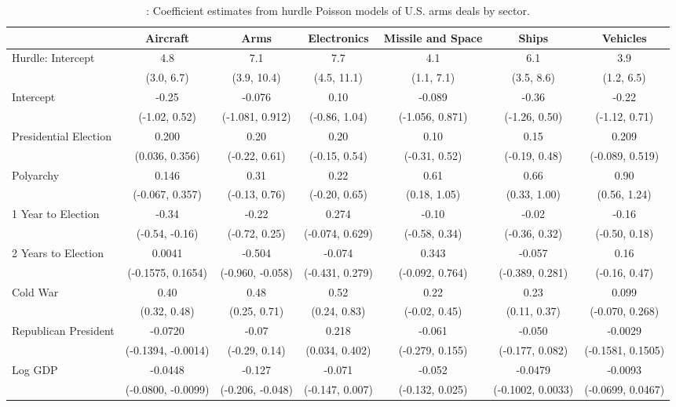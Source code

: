 \begin{table}[H]

\caption{\label{tab:pois-regs-sector}: Coefficient estimates from hurdle Poisson models of U.S. arms deals by sector.}
\centering
\fontsize{8}{10}\selectfont
\begin{tabular}[t]{lcccccc}
\toprule
  & Aircraft & Arms & Electronics & Missile and Space & Ships & Vehicles\\
\midrule
Hurdle: Intercept & 4.8 & 7.1 & 7.7 & 4.1 & 6.1 & 3.9\\
 & (3.0, 6.7) & (3.9, 10.4) & (4.5, 11.1) & (1.1, 7.1) & (3.5, 8.6) & (1.2, 6.5)\\
Intercept & -0.25 & -0.076 & 0.10 & -0.089 & -0.36 & -0.22\\
 & (-1.02, 0.52) & (-1.081, 0.912) & (-0.86, 1.04) & (-1.056, 0.871) & (-1.26, 0.50) & (-1.12, 0.71)\\
Presidential Election & 0.200 & 0.20 & 0.20 & 0.10 & 0.15 & 0.209\\
 & (0.036, 0.356) & (-0.22, 0.61) & (-0.15, 0.54) & (-0.31, 0.52) & (-0.19, 0.48) & (-0.089, 0.519)\\
Polyarchy & 0.146 & 0.31 & 0.22 & 0.61 & 0.66 & 0.90\\
 & (-0.067, 0.357) & (-0.13, 0.76) & (-0.20, 0.65) & (0.18, 1.05) & (0.33, 1.00) & (0.56, 1.24)\\
1 Year to Election & -0.34 & -0.22 & 0.274 & -0.10 & -0.02 & -0.16\\
 & (-0.54, -0.16) & (-0.72, 0.25) & (-0.074, 0.629) & (-0.58, 0.34) & (-0.36, 0.32) & (-0.50, 0.18)\\
2 Years to Election & 0.0041 & -0.504 & -0.074 & 0.343 & -0.057 & 0.16\\
 & (-0.1575, 0.1654) & (-0.960, -0.058) & (-0.431, 0.279) & (-0.092, 0.764) & (-0.389, 0.281) & (-0.16, 0.47)\\
Cold War & 0.40 & 0.48 & 0.52 & 0.22 & 0.23 & 0.099\\
 & (0.32, 0.48) & (0.25, 0.71) & (0.24, 0.83) & (-0.02, 0.45) & (0.11, 0.37) & (-0.070, 0.268)\\
Republican President & -0.0720 & -0.07 & 0.218 & -0.061 & -0.050 & -0.0029\\
 & (-0.1394, -0.0014) & (-0.29, 0.14) & (0.034, 0.402) & (-0.279, 0.155) & (-0.177, 0.082) & (-0.1581, 0.1505)\\
Log GDP & -0.0448 & -0.127 & -0.071 & -0.052 & -0.0479 & -0.0093\\
 & (-0.0800, -0.0099) & (-0.206, -0.048) & (-0.147, 0.007) & (-0.132, 0.025) & (-0.1002, 0.0033) & (-0.0699, 0.0467)\\

\end{tabular}
\end{table}
